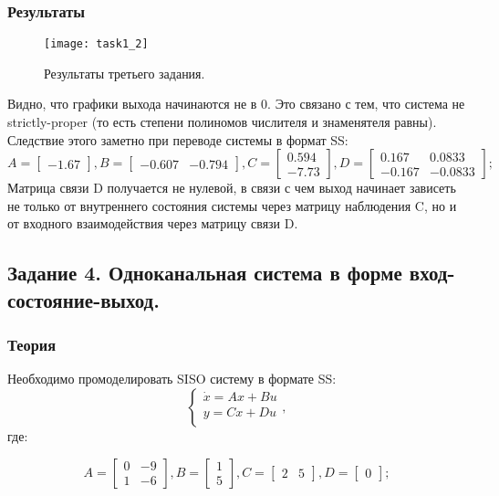 \documentclass[16pt]{article}
\begin{document}
\subsubsection{Результаты}
\begin{figure}[H]
	\centering
	\texttt{[image: task1\_2]}
	\caption{Результаты третьего задания.}
	\label{fig:fig3}
\end{figure}
Видно, что графики выхода начинаются не в 0. Это связано с тем, что система не strictly-proper (то есть степени полиномов числителя и знаменятеля равны). Следствие этого заметно при переводе системы в формат SS: 
\[ A = \begin{bmatrix}
    -1.67
    \end{bmatrix},
    B = \begin{bmatrix}
        -0.607 & -0.794
        \end{bmatrix},
    C = \begin{bmatrix}
        0.594 \\
        -7.73
        \end{bmatrix},
    D = \begin{bmatrix}
        0.167 & 0.0833 \\
        -0.167 & -0.0833
        \end{bmatrix};
\]
Матрица связи D получается не нулевой, в связи с чем выход начинает зависеть не только от внутреннего состояния системы через матрицу наблюдения C, но и от входного взаимодействия через матрицу связи D.

\newpage
\subsection{Задание 4. Одноканальная система в форме вход-состояние-выход.}
\subsubsection{Теория}
Необходимо промоделировать SISO систему в формате SS:
\[ 
    \begin{cases}
        \dot{x} = Ax + Bu \\
        y = Cx + Du \\
    \end{cases},
\]
где:

\[ 
    A = \begin{bmatrix}
        0 &  -9 \\
        1 &  -6 
        \end{bmatrix},
        B = \begin{bmatrix}
            1 \\
            5
            \end{bmatrix},
        C = \begin{bmatrix}
            2 & 5
            \end{bmatrix},
        D = \begin{bmatrix}
            0
            \end{bmatrix};
\]
\end{document}
